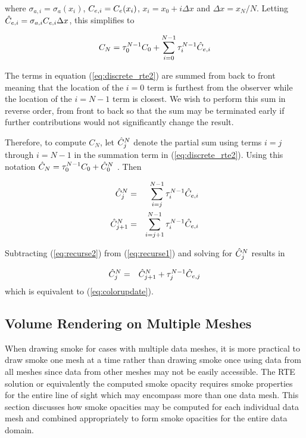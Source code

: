 where $\sigma_{a,i}=\sigma_a(x_i)$, $C_{e,i}=C_e(x_i)$, $x_i=x_0+i\Delta x$ and $\Delta x=x_N/N$.
Letting $\hat{C}_{e,i}=\sigma_{a,i}C_{e,i}\Delta x$, this simplifies to

\begin{equation}
\label{eq:discrete_rte2}
C_N = \tau_{0}^{N-1}C_0 + \sum_{i=0}^{N-1}\tau_{i}^{N-1}\hat{C}_{e,i}
\end{equation}

The terms in equation (\ref{eq:discrete_rte2}) are summed from back to front meaning that the location of the $i=0$ term is furthest from the observer while the location of the $i=N-1$ term is closest.  We wish to perform this sum in reverse order, from front to back so that the sum may be terminated early if further contributions would not significantly change the result.

Therefore, to compute $C_N$, let $\hat{C}_{j}^N$ denote the partial sum using terms $i=j$ through $i=N-1$ in the summation term in (\ref{eq:discrete_rte2}).  Using this notation $\hat{C}_N=\tau_{0}^{N-1}C_0+\hat{C}_{0}^N$ . Then

\begin{eqnarray}
\label{eq:recurse1}
\hat{C}_{j}^N &= &\sum_{i=j}^{N-1}\tau_{i}^{N-1}\hat{C}_{e,i}\\
\label{eq:recurse2}
\hat{C}_{j+1}^N     &= &\sum_{i=j+1}^{N-1}  \tau_{i}^{N-1}\hat{C}_{e,i}
\end{eqnarray}

Subtracting (\ref{eq:recurse2}) from (\ref{eq:recurse1}) and solving for $\hat{C}_{j}^N$ results in

\begin{eqnarray*}
\hat{C}_{j}^N&=&\hat{C}_{j+1}^N+\tau_{j}^{N-1}\hat{C}_{e,j}
\end{eqnarray*}
which is equivalent to (\ref{eq:colorupdate}).

%
%

\subsection{Volume Rendering on Multiple Meshes}
When drawing smoke for cases with multiple data meshes, it is more practical to draw smoke one mesh at a time rather than drawing smoke once using data from all meshes since data from other meshes may not be easily accessible.  The RTE solution or equivalently the computed smoke opacity requires smoke properties for the entire line of sight which may encompass more than one data mesh.  This section discusses how smoke opacities may be computed for each individual data mesh and combined appropriately to form smoke opacities for the entire data domain.

